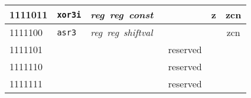 \documentclass[architecture]{compas2018}
\newcommand{\reg}{\textit{reg}}
\newcommand{\const}{\textit{const}}
\newcommand{\shiftval}{\textit{shiftval}}
\begin{document}
\begin{table}[!h]
\begin{center}
\begin{tabular}{|l|l|l|l|l|c|}
    \hline
    1111011 & \texttt{xor3i}  & \reg\ \reg\ \const\           &                                                      & {z}  & zcn         \\
    \hline
    1111100 & \texttt{asr3}   & \reg\  \reg\ \shiftval\       &                                                      &      & zcn         \\
    \hline
    1111101 & \texttt{}       &                               & reserved                                             &      &             \\
    \hline
    1111110 & \texttt{}       &                               & reserved                                             &      &             \\
    \hline
    1111111 & \texttt{}       &                               & reserved                                             &      &             \\
    \hline
  \end{tabular}
\end{center}
\end{table}
\end{document}
